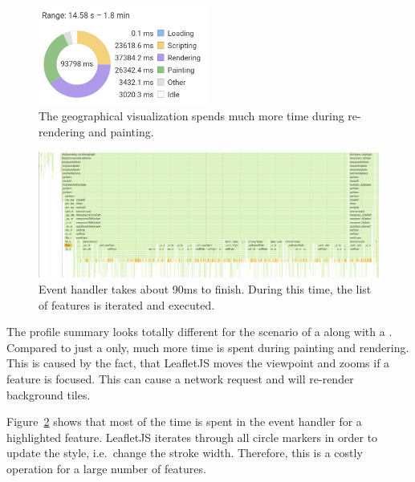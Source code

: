 \begin{figure}[h]
  \centering
  \includegraphics[width=0.5\textwidth]{figures/evaluation/performance/profiles/immoscout_both/summary}
  \caption{
    The geographical visualization spends much more time during re-rendering and painting.
  }\label{fig:evaluation:performance:profiling:immoscout_both:summary}
\end{figure}

\begin{figure}[h]
  \centering
  \includegraphics[width=\textwidth]{figures/evaluation/performance/profiles/immoscout_both/callstack}
  \caption{
    Event handler  takes about 90ms to finish.
    During this time, the list of features is iterated and  executed.
  }\label{fig:evaluation:performance:profiling:immoscout_both:callstack}
\end{figure}

The profile summary looks totally different for the scenario of a \tmap{} along with a \gvis{}.
Compared to just a \tmap{} only, much more time is spent during painting and rendering.
This is caused by the fact, that LeafletJS moves the viewpoint and zooms if a feature is focused.
This can cause a network request and will re-render background tiles.

Figure~\ref{fig:evaluation:performance:profiling:immoscout_both:callstack} shows that most of the time is spent in the event handler for a highlighted feature.
LeafletJS iterates through all circle markers in order to update the style, i.e.\ change the stroke width.
Therefore, this is a costly operation for a large number of features.

